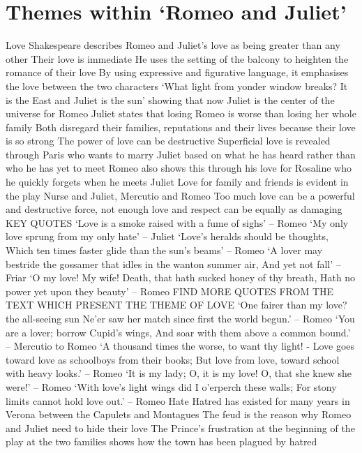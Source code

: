 \documentclass{article}
\begin{document}
\section{Themes within `Romeo and Juliet'}
\begin{outline}
\1 Love
\2 Shakespeare describes Romeo and Juliet's love as being greater than any other
\2 Their love is immediate
\2 He uses the setting of the balcony to heighten the romance of their love
\2 By using expressive and figurative language, it emphasises the love between the two characters
\2 `What light from yonder window breaks? It is the East and Juliet is the sun' showing that now Juliet is the center of the universe for Romeo
\2 Juliet states that losing Romeo is worse than losing her whole family
\2 Both disregard their families, reputations and their lives because their love is so strong
\2 The power of love can be destructive
\2 Superficial love is revealed through Paris who wants to marry Juliet based on what he has heard rather than who he has yet to meet
\2 Romeo also shows this through his love for Rosaline who he quickly forgets when he meets Juliet
\2 Love for family and friends is evident in the play
\2 Nurse and Juliet, Mercutio and Romeo
\2 Too much love can be a powerful and destructive force, not enough love and respect can be equally as damaging
\2 KEY QUOTES
\3 `Love is a smoke raised with a fume of sighs' -- Romeo
\3 `My only love sprung from my only hate' -- Juliet
\3 `Love's heralds should be thoughts, Which ten times faster glide than the sun's beams' -- Romeo
\3 `A lover may bestride the gossamer that idles in the wanton summer air, And yet not fall' -- Friar
\3 `O my love! My wife! Death, that hath sucked honey of thy breath, Hath no power yet upon they beauty' -- Romeo
\3 FIND MORE QUOTES FROM THE TEXT WHICH PRESENT THE THEME OF LOVE
\4 `One fairer than my love? the all-seeing sun Ne'er saw her match since first the world begun.' -- Romeo
\4 `You are a lover; borrow Cupid's wings, And soar with them above a common bound.' -- Mercutio to Romeo
\4 `A thousand times the worse, to want thy light! - Love goes toward love as schoolboys from their books; But love from love, toward school with heavy looks.' -- Romeo
\4 `It is my lady; O, it is my love! O, that she knew she were!' -- Romeo
\4 `With love's light wings did I o'erperch these walls; For stony limits cannot hold love out.' -- Romeo
\1 Hate
\2 Hatred has existed for many years in Verona between the Capulets and Montagues
\2 The feud is the reason why Romeo and Juliet need to hide their love
\2 The Prince's frustration at the beginning of the play at the two families shows how the town has been plagued by hatred

\end{outline}
\end{document}

